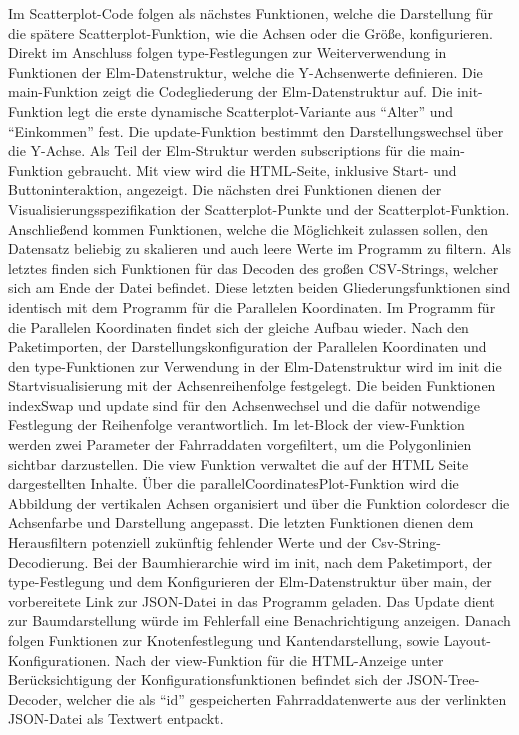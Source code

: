 \documentclass[usegeometry=true]{scrartcl}
\begin{document}
Im Scatterplot-Code folgen als nächstes Funktionen, welche die Darstellung für die spätere Scatterplot-Funktion, wie die Achsen oder die Größe, konfigurieren. Direkt im Anschluss folgen type-Festlegungen zur Weiterverwendung in Funktionen der Elm-Datenstruktur, welche die Y-Achsenwerte definieren. Die main-Funktion zeigt die Codegliederung der Elm-Datenstruktur auf.
Die init-Funktion legt die erste dynamische Scatterplot-Variante aus "`Alter"' und "`Einkommen"' fest. Die update-Funktion bestimmt den Darstellungswechsel über die Y-Achse. Als Teil der Elm-Struktur werden subscriptions für die main-Funktion gebraucht. Mit view wird die HTML-Seite, inklusive Start- und Buttoninteraktion, angezeigt. Die nächsten drei Funktionen dienen der Visualisierungsspezifikation der Scatterplot-Punkte und der Scatterplot-Funktion.
Anschließend kommen Funktionen, welche die Möglichkeit zulassen sollen, den Datensatz beliebig zu skalieren und auch leere Werte im Programm zu filtern. Als letztes finden sich Funktionen für das Decoden des großen CSV-Strings, welcher sich am Ende der Datei befindet. Diese letzten beiden Gliederungsfunktionen sind identisch mit dem Programm für die Parallelen Koordinaten. 
\newline Im Programm für die Parallelen Koordinaten findet sich der gleiche Aufbau wieder. Nach den Paketimporten, der Darstellungskonfiguration der Parallelen Koordinaten und den type-Funktionen zur Verwendung in der Elm-Datenstruktur wird im init die Startvisualisierung mit der Achsenreihenfolge festgelegt. Die beiden Funktionen indexSwap und update sind für den Achsenwechsel und die dafür notwendige Festlegung der Reihenfolge verantwortlich. 
Im let-Block der view-Funktion werden zwei Parameter der Fahrraddaten vorgefiltert, um die Polygonlinien sichtbar darzustellen. Die view Funktion verwaltet die auf der HTML Seite dargestellten Inhalte. Über die parallelCoordinatesPlot-Funktion wird die Abbildung der vertikalen Achsen organisiert und über die Funktion colordescr die Achsenfarbe und Darstellung angepasst. Die letzten Funktionen dienen dem Herausfiltern potenziell zukünftig fehlender Werte und der Csv-String-Decodierung. 
\newline Bei der Baumhierarchie wird im init, nach dem Paketimport, der type-Festlegung und dem Konfigurieren der Elm-Datenstruktur über main, der vorbereitete Link zur JSON-Datei in das Programm geladen. Das Update dient zur Baumdarstellung würde im Fehlerfall eine Benachrichtigung anzeigen. Danach folgen Funktionen zur Knotenfestlegung und Kantendarstellung, sowie Layout-Konfigurationen. Nach der view-Funktion für die HTML-Anzeige unter Berücksichtigung der Konfigurationsfunktionen befindet sich der JSON-Tree-Decoder, welcher die als "`id"' gespeicherten Fahrraddatenwerte aus der verlinkten JSON-Datei als Textwert entpackt. 
\end{document}

